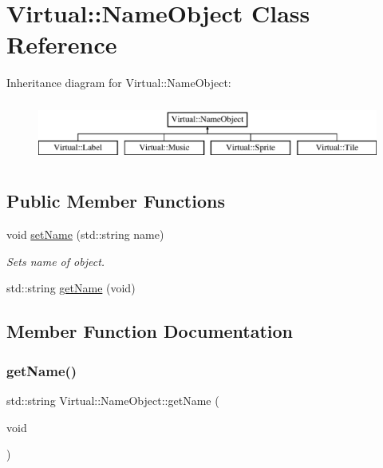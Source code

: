 \hypertarget{class_virtual_1_1_name_object}{}\section{Virtual\+:\+:Name\+Object Class Reference}
\label{class_virtual_1_1_name_object}
Inheritance diagram for Virtual\+:\+:Name\+Object\+:\begin{figure}[H]
\begin{center}
\leavevmode
\includegraphics[height=2.000000cm]{class_virtual_1_1_name_object}
\end{center}
\end{figure}
\subsection*{Public Member Functions}
\begin{DoxyCompactItemize}
\item 
void \hyperlink{class_virtual_1_1_name_object_a83cf1d1cf7b337169f060a64b6630eff}{set\+Name} (std\+::string name)
\begin{DoxyCompactList}\small\item\em Sets name of object. \end{DoxyCompactList}\item 
std\+::string \hyperlink{class_virtual_1_1_name_object_ac02bb53539491f47696ea22f09b4dc95}{get\+Name} (void)
\end{DoxyCompactItemize}


\subsection{Member Function Documentation}
\hypertarget{class_virtual_1_1_name_object_ac02bb53539491f47696ea22f09b4dc95}{}\label{class_virtual_1_1_name_object_ac02bb53539491f47696ea22f09b4dc95} 
\subsubsection{\texorpdfstring{get\+Name()}{getName()}}
{\footnotesize\ttfamily std\+::string Virtual\+::\+Name\+Object\+::get\+Name (\begin{DoxyParamCaption}\item[{void}]{ }\end{DoxyParamCaption})\hspace{0.3cm}{\ttfamily [inline]}}

